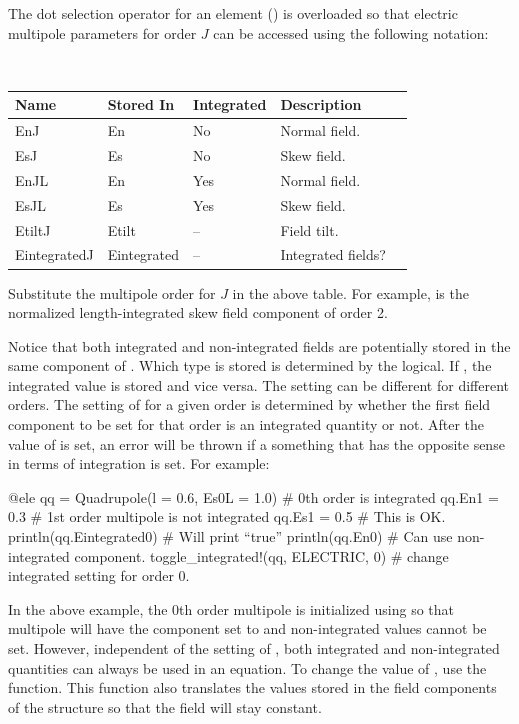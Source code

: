 The dot selection operator for an element () is overloaded so that 
electric multipole parameters for order $J$ can be accessed using the following notation:
\hfill\break
{\tt
\begin{tabular}{lllll} \toprule
  Name         & Stored In   & Integrated & Description \\ \midrule
  EnJ          & En          & No         & Normal field. \\
  EsJ          & Es          & No         & Skew field. \\
  EnJL         & En          & Yes        & Normal field. \\
  EsJL         & Es          & Yes        & Skew field. \\
  EtiltJ       & Etilt       & --         & Field tilt. \\
  EintegratedJ & Eintegrated & --         & Integrated fields? \\
  \bottomrule
\end{tabular}
} 
\hfill\break
Substitute the multipole order for $J$ in the above table. For example,  is the
normalized length-integrated skew field component of order 2. 

Notice that both integrated
and non-integrated fields are potentially stored in the same component of .
Which type is stored is determined by the  logical. If , the integrated
value is stored and vice versa. The  setting can be different for different orders.
The setting of  for a given order is determined by whether the first field component
to be set for that order is an integrated quantity or not. After the value of  is set,
an error will be thrown if a something that has the opposite sense in terms of integration is 
set. For example:
\begin{example}
  @ele qq = Quadrupole(l = 0.6, Es0L = 1.0)  # 0th order is integrated
  qq.En1 = 0.3                  # 1st order multipole is not integrated
  qq.Es1 = 0.5                  # This is OK.
  println(qq.Eintegrated0)      # Will print ``true''
  println(qq.En0)               # Can use non-integrated component.
  toggle_integrated!(qq, ELECTRIC, 0)  # change integrated setting for order 0.
\end{example}
In the above example, the 0th order multipole is initialized using  so that
multipole will have the  component set to  and non-integrated values
cannot be set. However, independent of the setting of , both integrated and
non-integrated quantities can always be used in an equation. To change the value of ,
use the  function. This function also translates the values stored in the
field components of the structure so that the field will stay constant.

